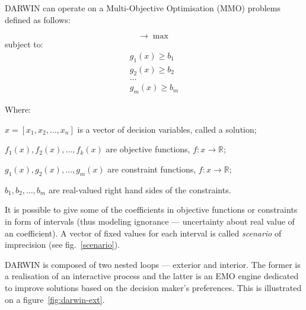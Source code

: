 DARWIN can operate on a Multi-Objective Optimisation (MMO) problems defined as
follows:

\begin{equation}
[ f_1(x), f_2(x), \dots, f_k(x) ] \rightarrow  \max
\end{equation}
subject to:
\begin{equation}
\begin{array}{l}
g_1(x) \geq b_1 \\
g_2(x) \geq b_2 \\
\dots \\
g_m(x) \geq b_m
\end{array}
\end{equation}

Where:
\begin{description}
\item $x = [x_1, x_2, \dots, x_n]$ is a vector of decision variables, called a
  solution;
\item $f_1(x), f_2(x), \dots, f_k(x)$ are objective functions,
  $f: x \rightarrow \mathbb{R}$;
\item $g_1(x), g_2(x), \dots, g_m(x)$ are constraint functions,
  $f: x \rightarrow \mathbb{R}$;
\item $b_1, b_2, \dots, b_m$ are real-valued right hand sides of the
  constraints.
\end{description}

It is possible to give some of the coefficients in objective functions or
constraints in form of intervals (thus modeling ignorance --- uncertainty
about real value of an coefficient). A vector of fixed values for each
interval is called \textit{scenario} of imprecision (see fig.~\ref{scenario}).

DARWIN is composed of two nested loops --- exterior and interior. The former
is a realisation of an interactive process and the latter is an EMO engine
dedicated to improve solutions based on the decision maker's preferences. This
is illustrated on a figure~\ref{fig:darwin-ext}.

